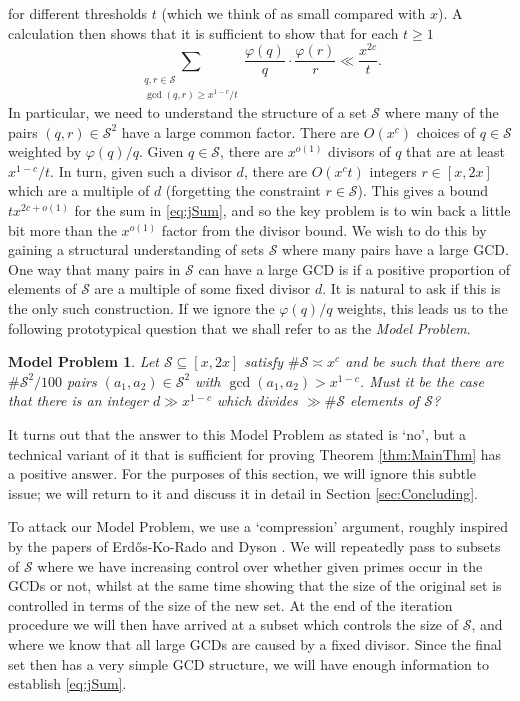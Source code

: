 \documentclass[12pt]{amsart}
\numberwithin{equation}{section}
\newtheorem*{ModelProblem}{Model Problem}
\theoremstyle{definition}
\theoremstyle{remark}
\newcommand{\CS}{\mathcal{S}}
\renewcommand{\phi}{\varphi}
\renewcommand{\ge}{\geqslant}
\begin{document}
for different thresholds $t$ (which we think of as small compared with $x$). A calculation then shows that it is sufficient to show that for each $t\ge1$
\begin{equation}
\sum_{\substack{q,r\in\CS \\ \gcd(q,r)\ge x^{1-c}/t}}\frac{\phi(q)}{q}\cdot  \frac{\phi(r)}{r}\ll \frac{x^{2c}}{t}.
\label{eq:jSum}
\end{equation}
In particular, we need to understand the structure of a set $\CS$ where many of the pairs $(q,r)\in\CS^2$ have a large common factor. There are $O(x^c)$ choices of $q\in \CS$ weighted by $\phi(q)/q$. Given $q\in \CS$, there are $x^{o(1)}$ divisors of $q$ that are at least $x^{1-c}/t$. In turn, given such a divisor $d$, there are $O(x^c t)$ integers $r\in[x,2x]$ which are a multiple of $d$ (forgetting the constraint $r\in\CS$). This gives a bound $t x^{2c+o(1)}$ for the sum in \eqref{eq:jSum}, and so the key problem is to win back a little bit more than the $x^{o(1)}$ factor from the divisor bound. We wish to do this by gaining a structural understanding of sets $\CS$ where many pairs have a large GCD. One way that many pairs in $\CS$ can have a large GCD is if a positive proportion of elements of $\CS$ are a multiple of some fixed divisor $d$. It is natural to ask if this is the only such construction. If we ignore the $\phi(q)/q$ weights, this leads us to the following prototypical question that we shall refer to as the {\it Model Problem}.

\begin{ModelProblem}
Let $\CS\subseteq[x,2x]$ satisfy $\#\CS\asymp x^{c}$ and be such that there are $\#\CS^2/100$ pairs $(a_1,a_2)\in\CS^2$ with $\gcd(a_1,a_2)>x^{1-c}$. Must it be the case that there is an integer $d\gg x^{1-c}$ which divides $\gg \#\CS$ elements of $\CS$? 
\end{ModelProblem}
It turns out that the answer to this Model Problem as stated is `no', but a technical variant of it that is sufficient for proving Theorem \ref{thm:MainThm} has a positive answer. For the purposes of this section, we will ignore this subtle issue; we will return to it and discuss it in detail in Section \ref{sec:Concluding}.

\medskip

To attack our Model Problem, we use a `compression' argument, roughly inspired by the papers of Erd\H os-Ko-Rado \cite{erdoskorado} and Dyson \cite{dyson}. We will repeatedly pass to subsets of $\CS$ where we have increasing control over whether given primes occur in the GCDs or not, whilst at the same time showing that the size of the original set is controlled in terms of the size of the new set. At the end of the iteration procedure we will then have arrived at a subset which controls the size of $\CS$,  and where we know that all large GCDs are caused by a fixed divisor. Since the final set then has a very simple GCD structure, we will have enough information to establish \eqref{eq:jSum}.
\end{document}
